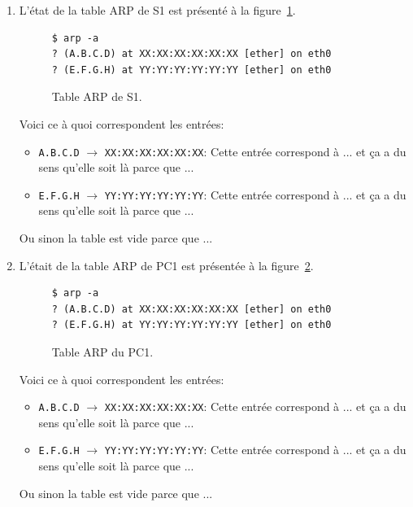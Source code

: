 \documentclass[]{article}
\begin{document}
\begin{enumerate}
    \item L'état de la table ARP de S1 est présenté à la figure~\ref{fig:arp-table-s1}.

    \begin{figure} 
        \centering
        \begin{lstlisting}
$ arp -a
? (A.B.C.D) at XX:XX:XX:XX:XX:XX [ether] on eth0
? (E.F.G.H) at YY:YY:YY:YY:YY:YY [ether] on eth0
        \end{lstlisting}
        \caption[]{Table ARP de S1.}
        \label{fig:arp-table-s1}
    \end{figure}

    Voici ce à quoi correspondent les entrées:

    \begin{itemize}
        \item \texttt{A.B.C.D} $\rightarrow$ \texttt{XX:XX:XX:XX:XX:XX}: Cette entrée correspond
              à ... et ça a du sens qu'elle soit là parce que ...
        \item \texttt{E.F.G.H} $\rightarrow$ \texttt{YY:YY:YY:YY:YY:YY}: Cette entrée correspond
              à ... et ça a du sens qu'elle soit là parce que ...
    \end{itemize}

    Ou sinon la table est vide parce que ...

    \item L'était de la table ARP de PC1 est présentée à la figure~\ref{fig:arp-table-pc1}.
    \begin{figure}
        \centering
        \begin{lstlisting}
$ arp -a
? (A.B.C.D) at XX:XX:XX:XX:XX:XX [ether] on eth0
? (E.F.G.H) at YY:YY:YY:YY:YY:YY [ether] on eth0
        \end{lstlisting}
        \caption[]{Table ARP du PC1.}
        \label{fig:arp-table-pc1}
    \end{figure}

    Voici ce à quoi correspondent les entrées:

    \begin{itemize}
        \item \texttt{A.B.C.D} $\rightarrow$ \texttt{XX:XX:XX:XX:XX:XX}: Cette entrée correspond
              à ... et ça a du sens qu'elle soit là parce que ...
        \item \texttt{E.F.G.H} $\rightarrow$ \texttt{YY:YY:YY:YY:YY:YY}: Cette entrée correspond
              à ... et ça a du sens qu'elle soit là parce que ...
    \end{itemize}

    Ou sinon la table est vide parce que ...

\end{enumerate}
\end{document}
